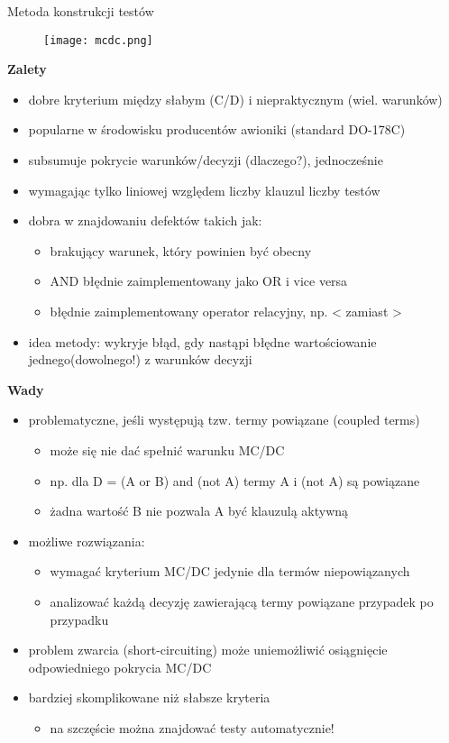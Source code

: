 \documentclass[../main.tex]{subfiles}
\begin{document}
    Metoda konstrukcji testów
    \begin{figure}[H]
        \texttt{[image: mcdc.png]}
    \end{figure}

    \textbf{Zalety}
    \begin{itemize}
        \item dobre kryterium między słabym (C/D) i niepraktycznym (wiel. warunków)
        \item popularne w środowisku producentów awioniki (standard DO-178C)
        \item subsumuje pokrycie warunków/decyzji (dlaczego?), jednocześnie
        \item wymagając tylko liniowej względem liczby klauzul liczby testów
        \item dobra w znajdowaniu defektów takich jak:
        \begin{itemize}
            \item brakujący warunek, który powinien być obecny
            \item AND błędnie zaimplementowany jako OR i vice versa
            \item błędnie zaimplementowany operator relacyjny, np. < zamiast >
        \end{itemize}
        \item idea metody: wykryje błąd, gdy nastąpi błędne wartościowanie jednego(dowolnego!) z warunków decyzji
    \end{itemize}

    \textbf{Wady}
    \begin{itemize}
        \item problematyczne, jeśli występują tzw. termy powiązane (coupled terms)
        \begin{itemize}
            \item może się nie dać spełnić warunku MC/DC
            \item np. dla D = (A or B) and (not A) termy A i (not A) są powiązane
            \item żadna wartość B nie pozwala A być klauzulą aktywną
        \end{itemize}
        \item możliwe rozwiązania:
        \begin{itemize}
            \item wymagać kryterium MC/DC jedynie dla termów niepowiązanych
            \item analizować każdą decyzję zawierającą termy powiązane przypadek po przypadku
        \end{itemize}
        \item problem zwarcia (short-circuiting) może uniemożliwić osiągnięcie
        odpowiedniego pokrycia MC/DC
        \item bardziej skomplikowane niż słabsze kryteria
        \begin{itemize}
            \item na szczęście można znajdować testy automatycznie!
        \end{itemize}
    \end{itemize}
\end{document}
